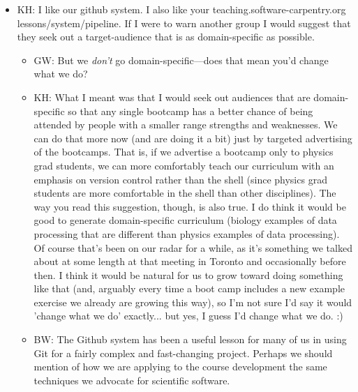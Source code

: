 \documentclass{article}
\begin{document}
\begin{itemize}

  \item KH: I like our github system. I also like your
    teaching.software-carpentry.org lessons/system/pipeline. If I were
    to warn another group I would suggest that they seek out a
    target-audience that is as domain-specific as possible.

    \begin{itemize}

      \item GW: But we \emph{don't} go domain-specific---does that
        mean you'd change what we do?

      \item KH: What I meant was that I would seek out audiences that
        are domain-specific so that any single bootcamp has a better
        chance of being attended by people with a smaller range
        strengths and weaknesses. We can do that more now (and are
        doing it a bit) just by targeted advertising of the
        bootcamps. That is, if we advertise a bootcamp only to physics
        grad students, we can more comfortably teach our curriculum
        with an emphasis on version control rather than the shell
        (since physics grad students are more comfortable in the shell
        than other disciplines). The way you read this suggestion,
        though, is also true. I do think it would be good to generate
        domain-specific curriculum (biology examples of data
        processing that are different than physics examples of data
        processing). Of course that's been on our radar for a while,
        as it's something we talked about at some length at that
        meeting in Toronto and occasionally before then. I think it
        would be natural for us to grow toward doing something like
        that (and, arguably every time a boot camp includes a new
        example exercise we already are growing this way), so I'm not
        sure I'd say it would 'change what we do' exactly... but yes,
        I guess I'd change what we do. :)

      \item BW: The Github system has been a useful lesson for many of
	us in using Git for a fairly complex and fast-changing project.
	Perhaps we should mention of how we are applying to the course development
	the same techniques we advocate for scientific software.

    \end{itemize}


\end{itemize}
\end{document}
